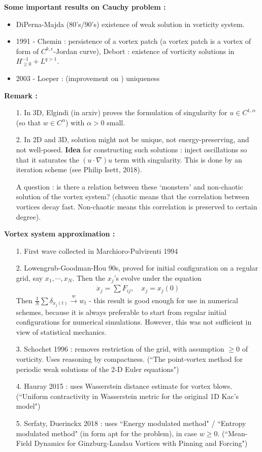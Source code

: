 \documentclass[12pt,a4paper]{extarticle}
\begin{document}
\textbf{Some important results on Cauchy problem :}
\begin{itemize}
\item DiPerna-Majda (80's/90's) existence of weak solution in vorticity system.
\item 1991 - Chemin : persistence of a vortex patch (a vortex patch is a vortex of form of $C^{k, \epsilon}$-Jordan curve), Debort : existence of vorticity solutions in $H^{-1}_{\geq 0} + L^{q>1}$.
\item 2003 - Loeper : (improvement on ) uniqueness 
\end{itemize}
\s

\textbf{Remark :}
\begin{itemize}
\item[1.] In 3D, Elgindi (in arxiv) proves the formulation of singularity for $u\in C^{1, \alpha}$ (so that $w\in C^{\alpha}$) with $\alpha >0$ small. 
\item[2.] In 2D and 3D, solution might not be unique, not energy-preserving, and not well-posed. \textbf{Idea} for constructing such solutions : inject oscillations so that it saturates the $(u\cdot \nabla)u$ term with singularity. This is done by an iteration scheme (see Philip Isett, 2018).

\quad A question : is there a relation between these `monsters' and non-chaotic solution of the vortex system? (chaotic means that the correlation between vortices decay fast. Non-chaotic means this correlation is preserved to certain degree).
\end{itemize}
\s

\textbf{Vortex system approximation :} 
\begin{itemize}
\item[1.] First wave collected in Marchioro-Pulvirenti 1994
\item[2.] Lowengrub-Goodman-Hou 90s, proved for initial configuration on a regular grid, say $x_1, \cdots, x_N$. Then the $x_j$'s evolve under the equation
\begin{align*}
\dot{x}_j = \sum F_{ij}, \quad x_j = x_j(0)
\end{align*}
Then $\frac{1}{N}\sum \delta_{x_j(t)} \xrightarrow{w} w_t$ - this result is good enough for use in numerical schemes, because it is always preferable to start from regular initial configurations for numerical simulations. However, this was not sufficient in view of statistical mechanics.
\item[3.]  Schochet 1996 : removes restriction of the grid, with assumption $\geq 0$ of vorticity. Uses reasoning by compactness. (``The point‐vortex method for periodic weak solutions of the 2‐D Euler equations")
\item[4.] Hauray 2015 : uses Wasserstein distance estimate for vortex blows. (``Uniform contractivity in Wasserstein metric for the original 1D Kac's model")
\item[5.] Serfaty, Duerinckx 2018 : uses ``Energy modulated method" / ``Entropy modulated method" (in form apt for the problem), in case $w\geq 0$. (``Mean-Field Dynamics for Ginzburg-Landau Vortices with Pinning and Forcing")
\end{itemize}
\end{document}
